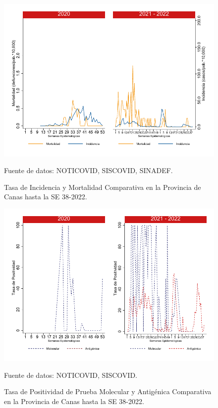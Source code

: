 \documentclass[12pt,a4paper,openany]{book}
\begin{document}
	
	\begin{figure}[h]
		\caption{Tasa de Incidencia y Mortalidad Comparativa en la Provincia de Canas hasta la SE 38-2022.}\label{fig:inc_mort_canas}
		\begin{center}
			\includegraphics[width=0.85\linewidth]{../figuras/incidencia_mortalidad_20_21_4.pdf}
		\end{center}
		{\footnotesize {Fuente de datos: NOTICOVID, SISCOVID, SINADEF.}}
	\end{figure}
	
	\begin{figure}[h]
		\caption{Tasa de Positividad de Prueba Molecular y Antigénica Comparativa en la Provincia de Canas hasta la SE 38-2022.}\label{fig:positividad_canas}
		\begin{center}
			\includegraphics[width=0.7\linewidth]{../figuras/positividad_20_21_4.pdf}
		\end{center}
		{\footnotesize {Fuente de datos: NOTICOVID, SISCOVID.}}
	\end{figure}
	
\end{document}
